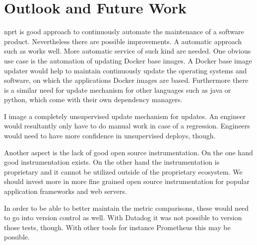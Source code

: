 \section{Outlook and Future Work}

\gls{nprt} is good approach to continuously automate the maintenance of a software
product. Nevertheless there are possible improvements. A automatic approach such as
\gemupdater works well. More automatic service of such kind are needed. One obvious use
case is the automation of updating Docker base images. A Docker base image updater would
help to maintain continuously update the operating systems and software, on which the
applications Docker images are based. Furthermore there is a similar need for update
mechanism for other languages such as java or python, which come with their own dependency
managers.

I image a completely unsupervised update mechanism for updates. An engineer would
resultantly only have to do manual work in case of a regression. Engineers would need to
have more confidence in unsupervised deploys, though.

Another aspect is the lack of good open source instrumentation. On the one hand good
instrumentation exists. On the other hand the instrumentation is proprietary and it cannot
be utilized outside of the proprietary ecosystem. We should invest more in more fine
grained open source instrumentation for popular application frameworks and web servers.

In order to be able to better maintain the metric comparisons, these would need to go into
version control as well. With Datadog it was not possible to version those tests,
though. With other tools for instance Prometheus this may be possible.

